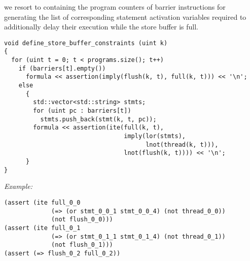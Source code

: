 we resort to  containing the program counters of barrier instructions for generating the list of corresponding statement activation variables required to additionally delay their execution while the store buffer is full.

\newpage

\begin{lstlisting}[style=c++]
void define_store_buffer_constraints (uint k)
{
  for (uint t = 0; t < programs.size(); t++)
    if (barriers[t].empty())
      formula << assertion(imply(flush(k, t), full(k, t))) << '\n';
    else
      {
        std::vector<std::string> stmts;
        for (uint pc : barriers[t])
          stmts.push_back(stmt(k, t, pc));
        formula << assertion(ite(full(k, t),
                                 imply(lor(stmts),
                                       lnot(thread(k, t))),
                                 lnot(flush(k, t)))) << '\n';
      }
}
\end{lstlisting}

\noindent
\emph{Example:} 


\begin{lstlisting}[style=smtlib]
(assert (ite full_0_0
             (=> (or stmt_0_0_1 stmt_0_0_4) (not thread_0_0))
             (not flush_0_0)))
(assert (ite full_0_1
             (=> (or stmt_0_1_1 stmt_0_1_4) (not thread_0_1))
             (not flush_0_1)))
(assert (=> flush_0_2 full_0_2))
\end{lstlisting}

